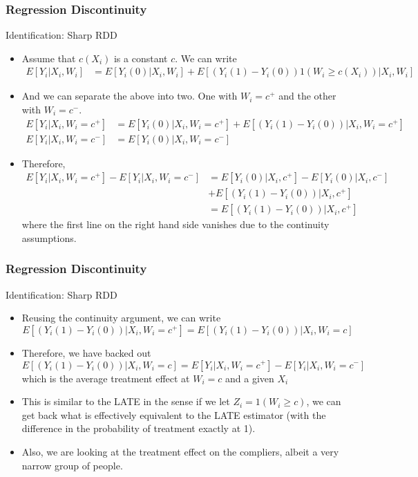 \documentclass{beamer}
\begin{document}
\begin{frame}
\frametitle{Regression Discontinuity}
Identification: Sharp RDD
\begin{itemize}
\item  Assume that $c(X_i)$ is a constant $c$. We can write
\footnotesize{\begin{align*}
E[Y_i|X_i, W_i]&=E[Y_i(0)|X_i, W_i]+E[(Y_i(1)-Y_i(0))1(W_i\geq c(X_i))|X_i, W_i]
\end{align*}}\normalsize
\item And we can separate the above into two. One with $W_i=c^+$ and the other with $W_i=c^-$.
\footnotesize{\begin{align*}
E[Y_i|X_i, W_i=c^+]&=E[Y_i(0)|X_i, W_i=c^+]+E[(Y_i(1)-Y_i(0))|X_i, W_i=c^+]\\
E[Y_i|X_i, W_i=c^-]&=E[Y_i(0)|X_i, W_i=c^-]
\end{align*}}\normalsize
\item  Therefore, 
\footnotesize{\begin{align*}
E[Y_i|X_i, W_i=c^+] - E[Y_i|X_i, W_i=c^-]&=E[Y_i(0)|X_i, c^+]-E[Y_i(0)|X_i, c^-]\\ &+E[(Y_i(1)-Y_i(0))|X_i, c^+]
\\&=E[(Y_i(1)-Y_i(0))|X_i, c^+]
\end{align*}}\normalsize
where the first line on the right hand side vanishes due to the continuity assumptions.
\end{itemize}
\end{frame}

\begin{frame}
\frametitle{Regression Discontinuity}
Identification: Sharp RDD
\begin{itemize}
\item Reusing the continuity argument, we can write  
\[
E[(Y_i(1)-Y_i(0))|X_i, W_i=c^+]=E[(Y_i(1)-Y_i(0))|X_i, W_i=c]
\]
\item Therefore, we have backed out
\[
E[(Y_i(1)-Y_i(0))|X_i, W_i=c]=E[Y_i|X_i, W_i=c^+] - E[Y_i|X_i, W_i=c^-]
\]
which is the average treatment effect at $W_i=c$ and a given $X_i$
\item  This is similar to the LATE in the sense if we let $Z_i=1(W_i\geq c)$, we can get back what is effectively equivalent to the LATE estimator (with the difference in the probability of treatment exactly at 1).
\item Also, we are looking at the treatment effect on the compliers, albeit a very narrow group of people.
\end{itemize}
\end{frame}
\end{document}
